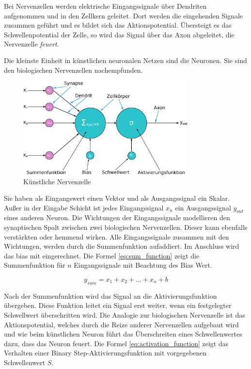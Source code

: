 Bei Nervenzellen werden elektrische Eingangssignale über Dendriten aufgenommen und in den Zellkern geleitet. Dort werden die eingehenden Signale zusammen geführt und es bildet sich das Aktionspotential. Übersteigt es das Schwellenpotential der Zelle, so wird das Signal über das Axon abgeleitet, die Nervenzelle \glqq \textit{feuert}\grqq.\vspace{0.2cm}

Die kleinste Einheit in künstlichen neuronalen Netzen sind die Neuronen. Sie sind den biologischen Nervenzellen nachempfunden.

\begin{figure}[!ht]
	\includegraphics[width=0.8\textwidth]{content/chapter_basics/images/artificial_neuron.eps}
	\centering
	\caption{Künstliche Nervenzelle}
	\label{img:artificial_neuron}
\end{figure}

Sie haben als Eingangswert einen Vektor und als Ausgangssignal ein Skalar. Außer in der Eingabe Schicht ist jedes Eingangssignal $x_n$ ein Ausgangssignal $y_{out}$ eines anderen Neuron. Die Wichtungen der Eingangssignale modellieren den synaptischen Spalt zwischen zwei biologischen Nervenzellen. Dieser kann ebenfalls verstärkten oder hemmend wirken. Alle Eingangssignale zusammen mit den Wichtungen, werden durch die Summenfunktion aufaddiert. Im Anschluss wird das \gls{bias} mit eingerechnet. Die Formel \ref{eq:sum_function} zeigt die Summenfunktion für $n$ Eingangssignale mit Beachtung des Bias Wert.

\begin{equation} \label{eq:sum_function}
	y_{sum} = x_{1} + x_{2} + \dots + x_{n} + b
\end{equation}

Nach der Summenfunktion wird das Signal an die Aktivierungsfunktion übergeben. Diese Funktion leitet ein Signal erst weiter, wenn ein festgelegter Schwellwert überschritten wird. Die Analogie zur biologischen Nervenzelle ist das Aktionspotential, welches durch die Reize anderer Nervenzellen aufgebaut wird und wie beim künstlichen Neuron führt das Überschreiten eines Schwellenwertes dazu, dass das Neuron \glqq feuert\grqq. Die Formel \ref{eq:activation_function} zeigt das Verhalten einer \glqq Binary Step\grqq -Aktivierungsfunktion mit vorgegebenen Schwellenwert $S$.

